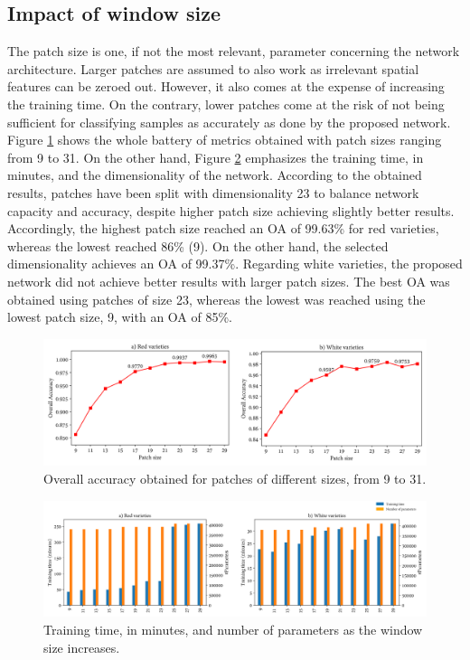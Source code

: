\subsection{Impact of window size}

The patch size is one, if not the most relevant, parameter concerning the network architecture. Larger patches are assumed to also work as irrelevant spatial features can be zeroed out. However, it also comes at the expense of increasing the training time. On the contrary, lower patches come at the risk of not being sufficient for classifying samples as accurately as done by the proposed network. Figure \ref{fig:window_size_test} shows the whole battery of metrics obtained with patch sizes ranging from 9 to 31. On the other hand, Figure \ref{fig:time_capacity_test} emphasizes the training time, in minutes, and the dimensionality of the network. According to the obtained results, patches have been split with dimensionality 23 to balance network capacity and accuracy, despite higher patch size achieving slightly better results. Accordingly, the highest patch size reached an OA of 99.63\% for red varieties, whereas the lowest reached 86\% (9). On the other hand, the selected dimensionality achieves an OA of 99.37\%. Regarding white varieties, the proposed network did not achieve better results with larger patch sizes. The best OA was obtained using patches of size 23, whereas the lowest was reached using the lowest patch size, 9, with an OA of 85\%.

\begin{figure}[ht]
    \centering
    \includegraphics[width=\linewidth]{figs/vineyard_classification/window_size_test.png}
	\caption{Overall accuracy obtained for patches of different sizes, from 9 to 31. }
	\label{fig:window_size_test}
\end{figure}

\begin{figure}[ht]
    \centering
    \includegraphics[width=\linewidth]{figs/vineyard_classification/time_capacity.png}
	\caption{Training time, in minutes, and number of parameters as the window size increases. }
	\label{fig:time_capacity_test}
\end{figure}

